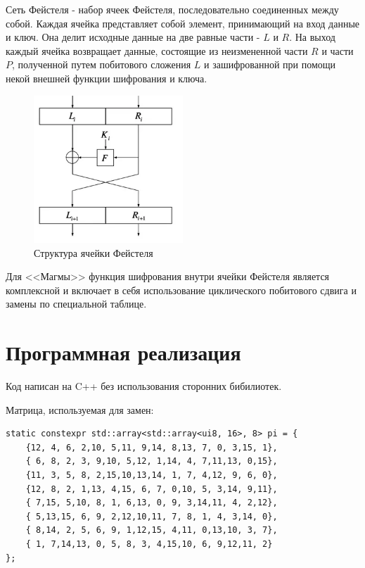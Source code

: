 \documentclass[a4paper]{article}
\begin{document}
  Сеть Фейстеля - набор ячеек Фейстеля, последовательно соединенных между собой.
  Каждая ячейка представляет собой элемент, принимающий на вход данные и ключ.
  Она делит исходные данные на две равные части - $L$ и $R$. На выход
  каждый ячейка возвращает данные, состоящие из неизмененной части
  $R$ и части $P$, полученной путем побитового сложения $L$ и зашифрованной
  при помощи некой внешней функции шифрования и ключа.

  \begin{figure}[H]
    \centering
    \includegraphics[width=0.5\textwidth]{16_1}
    \caption{Структура ячейки Фейстеля}
  \end{figure}

  Для <<Магмы>> функция шифрования внутри ячейки Фейстеля является
  комплексной и включает в себя использование циклического побитового сдвига
  и замены по специальной таблице.

  \section{Программная реализация}

  Код написан на C++ без использования сторонних бибилиотек.

  Матрица, используемая для замен:
  \begin{verbatim}
static constexpr std::array<std::array<ui8, 16>, 8> pi = {
    {12, 4, 6, 2,10, 5,11, 9,14, 8,13, 7, 0, 3,15, 1},
    { 6, 8, 2, 3, 9,10, 5,12, 1,14, 4, 7,11,13, 0,15},
    {11, 3, 5, 8, 2,15,10,13,14, 1, 7, 4,12, 9, 6, 0},
    {12, 8, 2, 1,13, 4,15, 6, 7, 0,10, 5, 3,14, 9,11},
    { 7,15, 5,10, 8, 1, 6,13, 0, 9, 3,14,11, 4, 2,12},
    { 5,13,15, 6, 9, 2,12,10,11, 7, 8, 1, 4, 3,14, 0},
    { 8,14, 2, 5, 6, 9, 1,12,15, 4,11, 0,13,10, 3, 7},
    { 1, 7,14,13, 0, 5, 8, 3, 4,15,10, 6, 9,12,11, 2}
};
  \end{verbatim}
\end{document}
